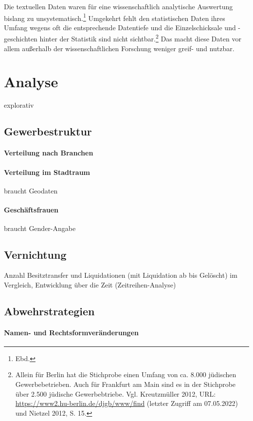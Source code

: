 Die textuellen Daten waren für eine wissenschaftlich analytische Auswertung bislang zu unsystematisch.\footnote{Ebd.} Umgekehrt fehlt den statistischen Daten ihres Umfang wegens oft die entsprechende Datentiefe und die Einzelschicksale und -geschichten hinter der Statistik sind nicht sichtbar.\footnote{Allein für Berlin hat die Stichprobe einen Umfang von ca. 8.000 jüdischen Gewerbebetrieben. Auch für Frankfurt am Main sind es in der Stichprobe über 2.500 jüdische Gewerbebtriebe. Vgl. Kreutzmüller 2012, URL: \url{https://www2.hu-berlin.de/djgb/www/find} (letzter Zugriff am 07.05.2022) und Nietzel 2012, S. 15.} Das macht diese Daten vor allem außerhalb der wissenschaftlichen Forschung weniger greif- und nutzbar. 

\section{Analyse}
explorativ
\subsection{Gewerbestruktur}
\paragraph{Verteilung nach Branchen}
\paragraph{Verteilung im Stadtraum}
braucht Geodaten
\paragraph{Geschäftsfrauen}
braucht Gender-Angabe
\subsection{Vernichtung}
Anzahl Besitztransfer und Liquidationen (mit Liquidation ab bis Gelöscht) im Vergleich, Entwicklung über die Zeit (Zeitreihen-Analyse)
\paragraph{}
\subsection{Abwehrstrategien}
\paragraph{Namen- und Rechtsformveränderungen}
